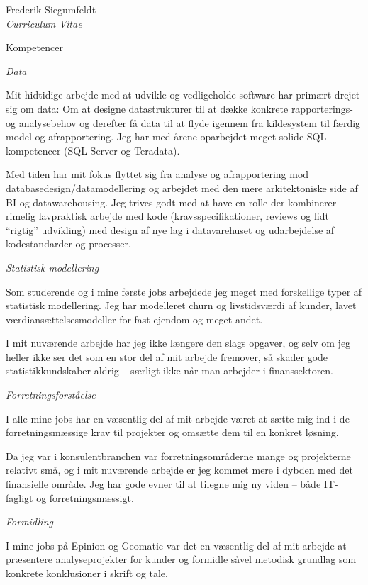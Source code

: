 \documentclass[a4paper]{article}
\begin{document}
\begin{cv}{Frederik Siegumfeldt\\{\large \itshape Curriculum Vitae}}
\begin{cvlist}{Kompetencer}
  \item[\emph{Data}]

    Mit hidtidige arbejde med at udvikle og vedligeholde software har 
    primært drejet sig om data: Om at designe datastrukturer til at 
    dække konkrete rappor\-terings- og analysebehov og derefter få data 
    til at flyde igennem fra kildesystem til færdig model og 
    afrapportering. Jeg har med årene oparbejdet meget solide 
    SQL-kompetencer (SQL Server og Teradata).

    Med tiden har mit fokus flyttet sig fra analyse og afrapportering 
    mod databasedesign/datamodellering og arbejdet med den mere 
    arkitektoniske side af BI og datawarehousing. Jeg trives godt med
    at have en rolle der kombinerer rimelig lavpraktisk arbejde med kode
    (kravsspecifikationer, reviews og lidt ``rigtig'' udvikling) med 
    design af nye lag i datavarehuset og udarbejdelse af kodestandarder 
    og processer.

  \item[\emph{Statistisk modellering}]

    Som studerende og i mine første jobs arbejdede jeg meget med 
    forskellige typer af statistisk modellering. Jeg har modelleret churn 
    og livstidsværdi af kunder, lavet værdiansættelsesmodeller for 
    fast ejendom og meget andet.

    I mit nuværende arbejde har jeg ikke længere den slags opgaver,
    og selv om jeg heller ikke ser det som en stor del af mit arbejde 
    fremover, så skader gode statistikkundskaber aldrig -- særligt 
    ikke når man arbejder i finanssektoren.

  \item[\emph{Forretningsforståelse}]

    I alle mine jobs har en væsentlig del af mit arbejde været at 
    sætte mig ind i de forretningsmæssige krav til projekter og omsætte 
    dem til en konkret løsning.

    Da jeg var i konsulentbranchen var forretningsområderne mange og 
    projekterne relativt små, og i mit nuværende arbejde er jeg kommet 
    mere i dybden med det finansielle område. Jeg har gode evner til 
    at tilegne mig ny viden -- både IT-fagligt og forretningsmæssigt.

  \item[\emph{Formidling}] 

    I mine jobs på Epinion og Geomatic var det en væsentlig del af 
    mit arbejde at præsentere analyseprojekter for kunder og formidle såvel 
    metodisk grundlag som konkrete konklusioner i skrift og tale.


\end{cvlist}
\end{cv}
\end{document}
